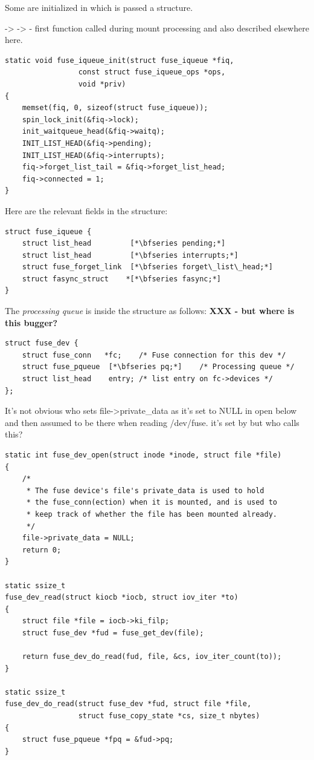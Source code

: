 \noindent
Some are initialized in  which is passed a  structure.

 ->  ->  - first function called during mount processing and also described elsewhere here.

\begin{lstlisting}
static void fuse_iqueue_init(struct fuse_iqueue *fiq,
                 const struct fuse_iqueue_ops *ops,
                 void *priv)
{
    memset(fiq, 0, sizeof(struct fuse_iqueue));
    spin_lock_init(&fiq->lock);
    init_waitqueue_head(&fiq->waitq);
    INIT_LIST_HEAD(&fiq->pending);
    INIT_LIST_HEAD(&fiq->interrupts);
    fiq->forget_list_tail = &fiq->forget_list_head;
    fiq->connected = 1;
} 
\end{lstlisting}

\noindent
Here are the relevant fields in the  structure:

\begin{lstlisting}
struct fuse_iqueue {
    struct list_head         [*\bfseries pending;*]
    struct list_head         [*\bfseries interrupts;*]
    struct fuse_forget_link  [*\bfseries forget\_list\_head;*]
    struct fasync_struct    *[*\bfseries fasync;*]
}
\end{lstlisting}

\noindent
The \textit{processing queue} is inside the  structure as follows: \textbf{XXX - but where is this bugger?}

\begin{lstlisting}
struct fuse_dev {
    struct fuse_conn   *fc;    /* Fuse connection for this dev */
    struct fuse_pqueue  [*\bfseries pq;*]    /* Processing queue */
    struct list_head    entry; /* list entry on fc->devices */
};
\end{lstlisting}

\noindent
It's not obvious who sets file->private\_data as it's set to NULL in open below and then assumed to be there when reading /dev/fuse. it's set by  but who calls this?

\begin{lstlisting}
static int fuse_dev_open(struct inode *inode, struct file *file)
{
    /*
     * The fuse device's file's private_data is used to hold
     * the fuse_conn(ection) when it is mounted, and is used to
     * keep track of whether the file has been mounted already.
     */
    file->private_data = NULL;
    return 0;
}

static ssize_t 
fuse_dev_read(struct kiocb *iocb, struct iov_iter *to)
{
    struct file *file = iocb->ki_filp;
    struct fuse_dev *fud = fuse_get_dev(file);  

    return fuse_dev_do_read(fud, file, &cs, iov_iter_count(to));
}

static ssize_t 
fuse_dev_do_read(struct fuse_dev *fud, struct file *file,
                 struct fuse_copy_state *cs, size_t nbytes)
{
    struct fuse_pqueue *fpq = &fud->pq;
}
\end{lstlisting}

